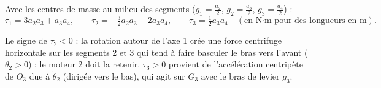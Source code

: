 \documentclass[11pt,a4paper]{article}
\newcommand{\dt}[1]{\dot\theta_{#1}}\newcommand{\ddt}[1]{\ddot\theta_{#1}}
\begin{document}
\begin{res}
Avec les centres de masse au milieu des segments ($g_1=\tfrac{a_2}2$, $g_2=\tfrac{a_3}2$, $g_3=\tfrac{a_4}2$) :
\[\tau_1=3a_2a_3+a_3a_4,\qquad \tau_2=-\tfrac32a_2a_3-2a_3a_4,\qquad \tau_3=\tfrac12a_3a_4\quad(\text{en N·m pour des longueurs en m}).\]
\end{res}
\begin{rem}
Le signe de $\tau_2<0$ : la rotation autour de l'axe 1 crée une force centrifuge horizontale sur les segments 2 et 3 qui tend à faire basculer le bras \og vers l'avant\fg{} ($\theta_2>0$) ; le moteur 2 doit la retenir. $\tau_3>0$ provient de l'accélération centripète de $O_3$ due à $\dt2$ (dirigée vers le bas), qui agit sur $G_3$ avec le bras de levier $g_3$.
\end{rem}
\end{document}
